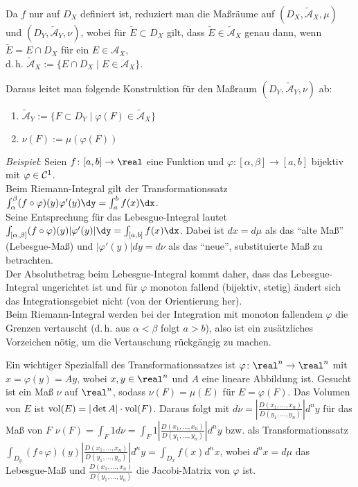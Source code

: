 Da $f$ nur auf $D_X$ definiert ist, reduziert man
die Maßräume auf $(D_X, \widetilde{\mathcal{A}}_X, \mu)$ und
$(D_Y, \widetilde{\mathcal{A}}_Y, \nu)$,
wobei für $\widetilde{E} \subset D_X$ gilt, dass
$\widetilde{E} \in \widetilde{\mathcal{A}}_X$ genau dann, wenn
$\widetilde{E} = E \cap D_X$ für ein $E \in \mathcal{A}_X$, \\
d.\,h. $\widetilde{\mathcal{A}}_X := \{E \cap D_X \;|\; E \in \mathcal{A}_X\}$.

Daraus leitet man folgende Konstruktion für den Maßraum
$(D_Y, \widetilde{\mathcal{A}}_Y, \nu)$ ab:
\begin{enumerate}
    \item
    $\widetilde{\mathcal{A}}_Y :=
    \{F \subset D_Y \;|\; \varphi(F) \in \widetilde{\mathcal{A}}_X\}$
    
    \item
    $\nu(F) := \mu(\varphi(F))$
\end{enumerate}

\linie

\emph{Beispiel}:
Seien $f\colon [a, b] \rightarrow \real$ eine Funktion und
$\varphi\colon [\alpha, \beta] \rightarrow [a, b]$ bijektiv
mit $\varphi \in \mathcal{C}^1$. \\
Beim Riemann-Integral gilt der Transformationssatz
$\int_\alpha^\beta (f \circ \varphi)(y) \varphi'(y) \dy = \int_a^b f(x)\dx$. \\
Seine Entsprechung für das Lebesgue-Integral lautet
$\int_{[\alpha, \beta]} (f \circ \varphi)(y) |\varphi'(y)| \dy =
\int_{[a, b]} f(x)\dx$.
Dabei ist $dx = d\mu$ als das "`alte Maß"' (Lebesgue-Maß)
und $|\varphi'(y)| dy = d\nu$ als das "`neue"',
substituierte Maß zu betrachten. \\
Der Absolutbetrag beim Lebesgue-Integral kommt daher, dass das
Lebesgue-Integral ungerichtet ist und für $\varphi$ monoton fallend
(bijektiv, stetig) ändert sich das Integrationsgebiet nicht
(von der Orientierung her). \\
Beim Riemann-Integral werden bei der Integration mit monoton fallendem
$\varphi$ die Grenzen vertauscht (d.\,h. aus $\alpha < \beta$ folgt
$a > b$), also ist ein zusätzliches Vorzeichen nötig, um die Vertauschung
rückgängig zu machen.

\linie

\pagebreak

Ein wichtiger Spezialfall des Transformationssatzes
ist $\varphi\colon \real^n \rightarrow \real^n$
mit $x = \varphi(y) = Ay$, wobei $x, y \in \real^n$ und
$A$ eine lineare Abbildung ist.
Gesucht ist ein Maß $\nu$ auf $\real^n$, sodass
$\nu(F) = \mu(E)$ für $E = \varphi(F)$.
Das Volumen von $E$ ist ${\operatorname{vol}}(E) = |\det A| \cdot {\operatorname{vol}}(F)$.
Daraus folgt mit
$d\nu = \left|\frac{D(x_1, \dotsc, x_n)}{D(y_1, \dotsc, y_n)}\right| d^n y$
für das Maß von $F$
$\nu(F) = \int_F 1 d\nu =
\int_F 1 \left|\frac{D(x_1, \dotsc, x_n)}{D(y_1, \dotsc, y_n)}\right| d^n y$
bzw. als Transformationssatz
$\int_{D_y} (f \circ \varphi)(y)
\left|\frac{D(x_1, \dotsc, x_n)}{D(y_1, \dotsc, y_n)}\right| d^n y =
\int_{D_x} f(x) d^n x$, wobei $d^n x = d\mu$ das Lebesgue-Maß
und $\frac{D(x_1, \dotsc, x_n)}{D(y_1, \dotsc, y_n)}$ die Jacobi-Matrix
von $\varphi$ ist.

